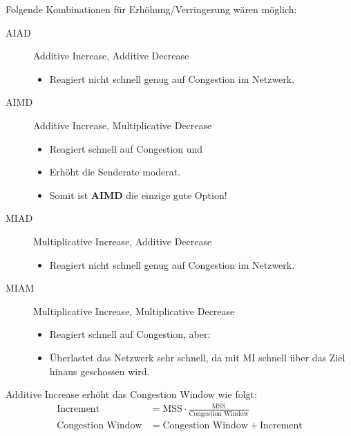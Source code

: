 \documentclass[a4paper, 11pt, accentcolor = tud3b]{tudreport}
\begin{document}
                    Folgende Kombinationen für Erhöhung/Verringerung wären möglich:
                    \begin{description}
                    	\item[AIAD] Additive Increase, Additive Decrease
	                    	\begin{itemize}
	                    		\item Reagiert nicht schnell genug auf Congestion im Netzwerk.
	                    	\end{itemize}
                    	\item[AIMD] Additive Increase, Multiplicative Decrease
	                    	\begin{itemize}
	                    		\item Reagiert schnell auf Congestion und
	                    		\item Erhöht die Senderate moderat.
	                    		\item Somit ist \textbf{AIMD} die einzige gute Option!
	                    	\end{itemize}
                    	\item[MIAD] Multiplicative Increase, Additive Decrease
	                    	\begin{itemize}
	                    		\item Reagiert nicht schnell genug auf Congestion im Netzwerk.
	                    	\end{itemize}
                    	\item[MIAM] Multiplicative Increase, Multiplicative Decrease
	                    	\begin{itemize}
	                    		\item Reagiert schnell auf Congestion, aber:
	                    		\item Überlastet das Netzwerk sehr schnell, da mit MI schnell über das Ziel hinaus geschossen wird.
	                    	\end{itemize}
                    \end{description}
                    
                    Additive Increase erhöht das Congestion Window wie folgt:
                    \begin{align*}
                    	\text{Increment}         & = \text{MSS} \cdot \frac{\text{MSS}}{\text{Congestion Window}} \\
                    	\text{Congestion Window} & = \text{Congestion Window} + \text{Increment}
                    \end{align*}
                    
\end{document}
